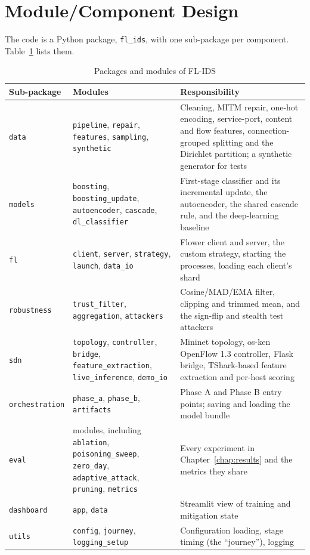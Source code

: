 \section{Module/Component Design}
The code is a Python package, \texttt{fl\_ids}, with one sub-package per component. Table~\ref{tab:modules} lists them.
\begin{table}[H]
\centering
\scriptsize
\renewcommand{\arraystretch}{1.2}
\begin{tabular}{|>{\raggedright\arraybackslash}p{2.6cm}|>{\raggedright\arraybackslash}p{3.9cm}|>{\raggedright\arraybackslash}p{6.4cm}|}
\hline
\textbf{Sub-package} & \textbf{Modules} & \textbf{Responsibility} \\ \hline
\texttt{data} & \texttt{pipeline}, \texttt{repair}, \texttt{features}, \texttt{sampling}, \texttt{synthetic} & Cleaning, MITM repair, one-hot encoding, service-port, content and flow features, connection-grouped splitting and the Dirichlet partition; a synthetic generator for tests \\ \hline
\texttt{models} & \texttt{boosting}, \texttt{boosting\_update}, \texttt{autoencoder}, \texttt{cascade}, \texttt{dl\_classifier} & First-stage classifier and its incremental update, the autoencoder, the shared cascade rule, and the deep-learning baseline \\ \hline
\texttt{fl} & \texttt{client}, \texttt{server}, \texttt{strategy}, \texttt{launch}, \texttt{data\_io} & Flower client and server, the custom strategy, starting the processes, loading each client's shard \\ \hline
\texttt{robustness} & \texttt{trust\_filter}, \texttt{aggregation}, \texttt{attackers} & Cosine/MAD/EMA filter, clipping and trimmed mean, and the sign-flip and stealth test attackers \\ \hline
\texttt{sdn} & \texttt{topology}, \texttt{controller}, \texttt{bridge}, \texttt{feature\_extraction}, \texttt{live\_inference}, \texttt{demo\_io} & Mininet topology, os-ken OpenFlow 1.3 controller, Flask bridge, TShark-based feature extraction and per-host scoring \\ \hline
\texttt{orchestration} & \texttt{phase\_a}, \texttt{phase\_b}, \texttt{artifacts} & Phase A and Phase B entry points; saving and loading the model bundle \\ \hline
\texttt{eval} & 18 modules, including \texttt{ablation}, \texttt{poisoning\_sweep}, \texttt{zero\_day}, \texttt{adaptive\_attack}, \texttt{pruning}, \texttt{metrics} & Every experiment in Chapter~\ref{chap:results} and the metrics they share \\ \hline
\texttt{dashboard} & \texttt{app}, \texttt{data} & Streamlit view of training and mitigation state \\ \hline
\texttt{utils} & \texttt{config}, \texttt{journey}, \texttt{logging\_setup} & Configuration loading, stage timing (the ``journey''), logging \\ \hline
\end{tabular}
\caption{Packages and modules of FL-IDS}
\label{tab:modules}
\end{table}
